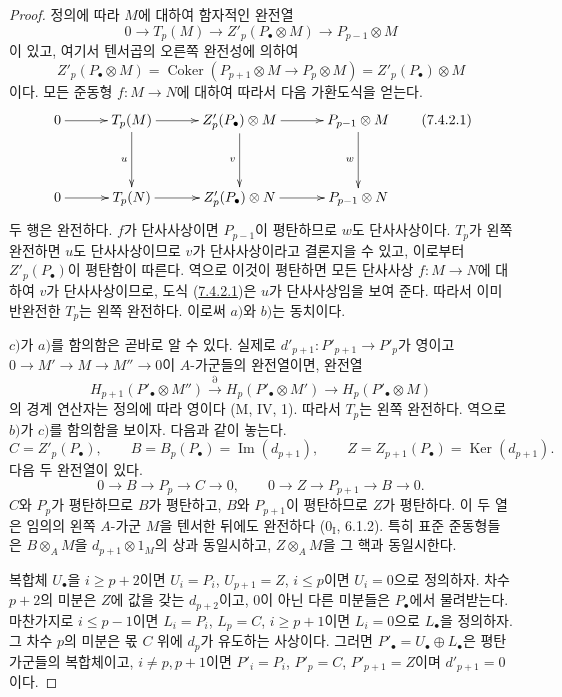 \begin{proof}
정의에 따라 $M$에 대하여 함자적인 완전열
\[
  0\longrightarrow T_p(M)
  \longrightarrow Z'_p(P_\bullet\otimes M)
  \longrightarrow P_{p-1}\otimes M
\]
이 있고, 여기서 텐서곱의 오른쪽 완전성에 의하여
\[
  Z'_p(P_\bullet\otimes M)
  =
  \operatorname{Coker}(P_{p+1}\otimes M\longrightarrow P_p\otimes M)
  =
  Z'_p(P_\bullet)\otimes M
\]
이다. 모든 준동형 $f:M\to N$에 대하여 따라서 다음 가환도식을 얻는다.
\[
\xymatrix@C=30pt@R=38pt{
  0\ar[r]
  &T_p(M)\ar[r]\ar[d]_u
  &Z'_p(P_\bullet)\otimes M\ar[r]\ar[d]_v
  &P_{p-1}\otimes M\ar[d]_w
  \\
  0\ar[r]
  &T_p(N)\ar[r]
  &Z'_p(P_\bullet)\otimes N\ar[r]
  &P_{p-1}\otimes N
}
\tag{7.4.2.1}\label{III.7.4.2.1.fr}
\]
두 행은 완전하다. $f$가 단사사상이면 $P_{p-1}$이 평탄하므로
$w$도 단사사상이다. $T_p$가 왼쪽 완전하면 $u$도 단사사상이므로
$v$가 단사사상이라고 결론지을 수 있고, 이로부터
$Z'_p(P_\bullet)$이 평탄함이 따른다. 역으로 이것이 평탄하면 모든
단사사상 $f:M\to N$에 대하여 $v$가 단사사상이므로, 도식
(\hyperref[III.7.4.2.1.fr]{7.4.2.1})은 $u$가 단사사상임을 보여 준다.
따라서 이미 반완전한 $T_p$는 왼쪽 완전하다. 이로써 $a)$와 $b)$는
동치이다.

$c)$가 $a)$를 함의함은 곧바로 알 수 있다. 실제로
$d'_{p+1}:P'_{p+1}\to P'_p$가 영이고
$0\to M'\to M\to M''\to0$이 $A$-가군들의 완전열이면, 완전열
\[
  H_{p+1}(P'_\bullet\otimes M'')
  \xrightarrow{\partial}H_p(P'_\bullet\otimes M')
  \longrightarrow H_p(P'_\bullet\otimes M)
\]
의 경계 연산자는 정의에 따라 영이다 (M, IV, 1). 따라서 $T_p$는
왼쪽 완전하다. 역으로 $b)$가 $c)$를 함의함을 보이자. 다음과 같이
놓는다.
\[
 C=Z'_p(P_\bullet),\qquad
 B=B_p(P_\bullet)=\operatorname{Im}(d_{p+1}),\qquad
 Z=Z_{p+1}(P_\bullet)=\operatorname{Ker}(d_{p+1}).
\]
다음 두 완전열이 있다.
\[
 0\longrightarrow B\longrightarrow P_p\longrightarrow C\longrightarrow0,
 \qquad
 0\longrightarrow Z\longrightarrow P_{p+1}\longrightarrow B\longrightarrow0.
\]
$C$와 $P_p$가 평탄하므로 $B$가 평탄하고, $B$와 $P_{p+1}$이
평탄하므로 $Z$가 평탄하다. 이 두 열은 임의의 왼쪽 $A$-가군 $M$을
텐서한 뒤에도 완전하다 ($0_{\mathrm I}$, 6.1.2). 특히 표준 준동형들은
$B\otimes_A M$을 $d_{p+1}\otimes1_M$의 상과 동일시하고,
$Z\otimes_A M$을 그 핵과 동일시한다.

복합체 $U_\bullet$을 $i\geq p+2$이면 $U_i=P_i$,
$U_{p+1}=Z$, $i\leq p$이면 $U_i=0$으로 정의하자. 차수 $p+2$의
미분은 $Z$에 값을 갖는 $d_{p+2}$이고, 0이 아닌 다른 미분들은
$P_\bullet$에서 물려받는다. 마찬가지로 $i\leq p-1$이면
$L_i=P_i$, $L_p=C$, $i\geq p+1$이면 $L_i=0$으로 $L_\bullet$을
정의하자. 그 차수 $p$의 미분은 몫 $C$ 위에 $d_p$가 유도하는
사상이다. 그러면
$P'_\bullet=U_\bullet\oplus L_\bullet$은 평탄 가군들의 복합체이고,
$i\ne p,p+1$이면 $P'_i=P_i$, $P'_p=C$, $P'_{p+1}=Z$이며
$d'_{p+1}=0$이다.


\end{proof}
